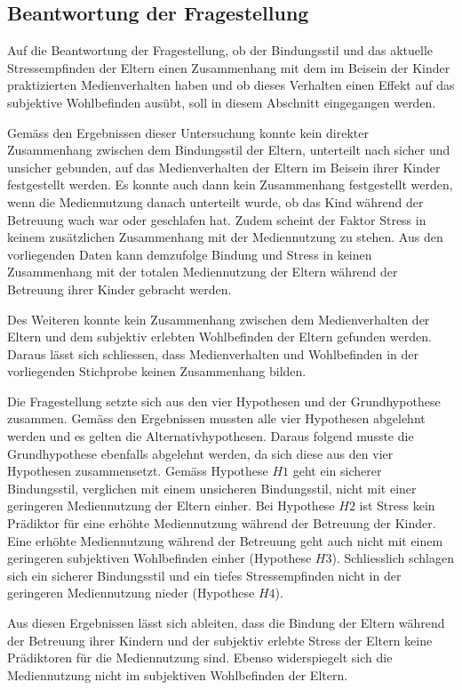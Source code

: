 \subsection{Beantwortung der Fragestellung} \label{sec:BeantwortungFragestellung}
Auf die Beantwortung der Fragestellung, ob der Bindungsstil und das aktuelle Stressempfinden der Eltern einen Zusammenhang mit dem im Beisein der Kinder praktizierten Medienverhalten haben und ob dieses Verhalten einen Effekt auf das subjektive Wohlbefinden ausübt, soll in diesem Abschnitt eingegangen werden.

Gemäss den Ergebnissen dieser Untersuchung konnte kein direkter Zusammenhang zwischen dem Bindungsstil der Eltern, unterteilt nach sicher und unsicher gebunden, auf das Medienverhalten der Eltern im Beisein ihrer Kinder festgestellt werden. Es konnte auch dann kein Zusammenhang festgestellt werden, wenn die Mediennutzung danach unterteilt wurde, ob das Kind während der Betreuung wach war oder geschlafen hat. Zudem scheint der Faktor Stress in keinem zusätzlichen Zusammenhang mit der Mediennutzung zu stehen. Aus den vorliegenden Daten kann demzufolge Bindung und Stress in keinen Zusammenhang mit der totalen Mediennutzung der Eltern während der Betreuung ihrer Kinder gebracht werden.

Des Weiteren konnte kein Zusammenhang zwischen dem Medienverhalten der Eltern und dem subjektiv erlebten Wohlbefinden der Eltern gefunden werden. Daraus lässt sich schliessen, dass Medienverhalten und Wohlbefinden in der vorliegenden Stichprobe keinen Zusammenhang bilden.

Die Fragestellung setzte sich aus den vier Hypothesen und der Grundhypothese zusammen. Gemäss den Ergebnissen mussten alle vier Hypothesen abgelehnt werden und es gelten die Alternativhypothesen. Daraus folgend musste die Grundhypothese ebenfalls abgelehnt werden, da sich diese aus den vier Hypothesen zusammensetzt. Gemäss Hypothese $H1$ geht ein sicherer Bindungsstil, verglichen mit einem unsicheren Bindungsstil, nicht mit einer geringeren Mediennutzung der Eltern einher. Bei Hypothese $H2$ ist Stress kein Prädiktor für eine erhöhte Mediennutzung während der Betreuung der Kinder. Eine erhöhte Mediennutzung während der Betreuung geht auch nicht mit einem geringeren subjektiven Wohlbefinden einher (Hypothese $H3$). Schliesslich schlagen sich ein sicherer Bindungsstil und ein tiefes Stressempfinden nicht in der geringeren Mediennutzung nieder (Hypothese $H4$).

Aus diesen Ergebnissen lässt sich ableiten, dass die Bindung der Eltern während der Betreuung ihrer Kindern und der subjektiv erlebte Stress der Eltern keine Prädiktoren für die Mediennutzung sind. Ebenso widerspiegelt sich die Mediennutzung nicht im subjektiven Wohlbefinden der Eltern.

